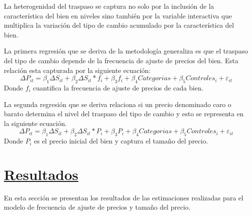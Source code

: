 \documentclass[12pt,a4paper,pdflatex]{article}
\begin{document}
La heterogenidad del traspaso se captura no solo por la inclusión de la característica del bien en niveles sino también por la variable interactiva que multiplica la variación del tipo de cambio acumulado por la característica del bien.

La primera regresión que se deriva de la metodología generaliza es que el traspaso del tipo de cambio depende de la frecuencia de ajuste de precios del bien. Esta relación esta capturada por la siguiente ecuación:
\begin{equation}
\Delta P_{it} = \beta_{1} \Delta S_{it}  + \beta_{2} \Delta S_{it}*f_{i} + \beta_{3}f_{i} + \beta_{4}Categorias + \beta_{5}Controles_{i} + \varepsilon_{it}
\end{equation}
Donde $f_{i}$ cuantifica la frecuencia de ajuste de precios de cada bien.

La segunda regresión que se deriva relaciona si un precio denominado caro o barato determina el nivel del traspaso del tipo de cambio y esto se representa en la siguiente ecuación.
\begin{equation}
\Delta P_{it} = \beta_{1} \Delta S_{it}  + \beta_{2} \Delta S_{it}*P_{i} + \beta_{3}P_{i} + \beta_{4}Categorias + \beta_{5}Controles_{i} + \varepsilon_{it}
\end{equation}
Donde $P_{i}$ es el precio inicial del bien y captura el tamaño del precio.

\clearpage

\section{\underline{Resultados}}\label{sec4}

En esta sección se presentan los resultados de las estimaciones realizadas para el modelo de frecuencia de ajuste de precios y tamaño del precio.
\end{document}
